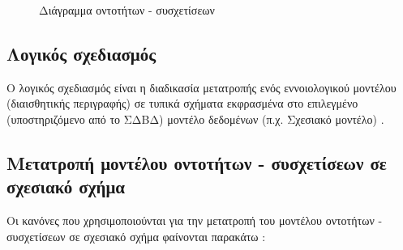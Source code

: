 \documentclass{assignment}
\begin{document}
\begin{landscape}
\begin{figure}
\begin{center}
\caption{Διάγραμμα οντοτήτων - συσχετίσεων}
\label{fig:ER:diagram}
\end{center}
\end{figure}
\end{landscape}

\subsection{Λογικός σχεδιασμός}

Ο λογικός σχεδιασμός είναι η διαδικασία μετατροπής ενός εννοιολογικού μοντέλου (διαισθητικής περιγραφής) σε τυπικά σχήματα εκφρασμένα στο επιλεγμένο (υποστηριζόμενο από το ΣΔΒΔ) μοντέλο δεδομένων (π.χ. Σχεσιακό μοντέλο) \cite{theodoridis_class_notes}.



\subsection{Μετατροπή μοντέλου οντοτήτων - συσχετίσεων σε σχεσιακό σχή\-μα}

Οι κανόνες που χρησιμοποιούνται για την μετατροπή του μοντέλου οντοτήτων - συσχετίσεων σε σχεσιακό σχήμα φαίνονται παρακάτω \cite{theodoridis_class_notes}:
\end{document}
